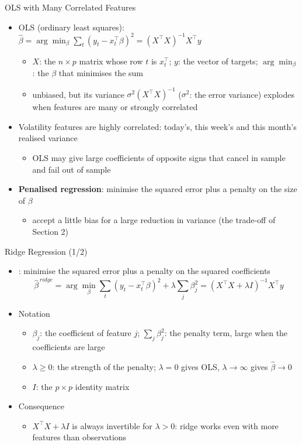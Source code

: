 \begin{frame}{OLS with Many Correlated Features}
\itemsize{\small}
\begin{itemize}
    \item OLS (ordinary least squares): $\hat\beta = \arg\min_\beta \sum_t (y_t - x_t^\top\beta)^2 = (X^\top X)^{-1}X^\top y$
    \begin{itemize}
        \item $X$: the $n \times p$ matrix whose row $t$ is $x_t^\top$; $y$: the vector of targets; $\arg\min_\beta$: the $\beta$ that minimises the sum
        \item unbiased, but its variance $\sigma^2(X^\top X)^{-1}$ ($\sigma^2$: the error variance) explodes when features are many or strongly correlated
    \end{itemize}
    \item Volatility features are highly correlated: today's, this week's and this month's realised variance
    \begin{itemize}
        \item OLS may give large coefficients of opposite signs that cancel in sample and fail out of sample
    \end{itemize}
    \item \textbf{Penalised regression}: minimise the squared error plus a penalty on the size of $\beta$
    \begin{itemize}
        \item accept a little bias for a large reduction in variance (the trade-off of Section 2)
    \end{itemize}
\end{itemize}
\end{frame}

\begin{frame}{Ridge Regression (1/2)}
\itemsize{\small}
\begin{itemize}
    \item {}: minimise the squared error plus a penalty on the squared coefficients \[ \hat\beta^{\,ridge} = \arg\min_\beta \sum_t (y_t - x_t^\top\beta)^2 + \lambda\sum_j \beta_j^2 = (X^\top X + \lambda I)^{-1}X^\top y \]
    \item Notation
    \begin{itemize}
        \item $\beta_j$: the coefficient of feature $j$; $\sum_j \beta_j^2$: the penalty term, large when the coefficients are large
        \item $\lambda \ge 0$: the strength of the penalty; $\lambda = 0$ gives OLS, $\lambda \to \infty$ gives $\hat\beta \to 0$
        \item $I$: the $p \times p$ identity matrix
    \end{itemize}
    \item Consequence
    \begin{itemize}
        \item $X^\top X + \lambda I$ is always invertible for $\lambda > 0$: ridge works even with more features than observations
    \end{itemize}
\end{itemize}
\end{frame}

